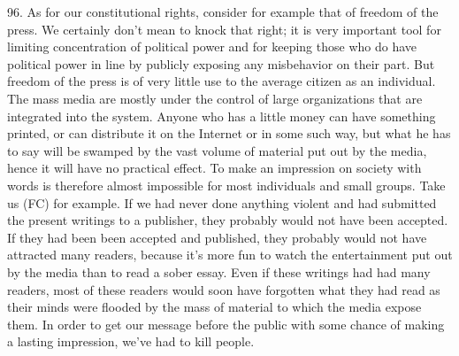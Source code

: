 \documentclass{article}
\begin{document}
96.  As  for  our  constitutional  rights,  consider  for  example  that  of  freedom  of  the  press.   We 
certainly  don’t  mean  to  knock  that  right;  it  is  very  important  tool  for  limiting  concentration  of  
political power and for keeping those who do have political power in line by publicly exposing 
any misbehavior on their part.  But freedom of the press is of very little use to the average citizen 
as  an  individual.   The  mass  media  are  mostly  under  the  control  of  large  organizations  that  are  
integrated  into  the  system.   Anyone  who  has  a  little  money  can  have  something  printed,  or  can  
distribute it on the Internet or in some such way, but what he has to say will be swamped by the 
vast volume of material put out by the media, hence it will have no practical effect.  To make an 
impression on society with words is therefore almost impossible for most individuals and small 
groups.  Take us (FC) for example.  If we had never done anything violent and had submitted the 
present  writings  to  a  publisher,  they  probably  would  not  have  been  accepted.   If  they  had  been  
been accepted and published, they probably would not have attracted many readers, because it’s 
more fun to watch the entertainment put out by the media than to read a sober essay.  Even if these 
writings had had many readers, most of these readers would soon have forgotten what they had 
read as their minds were flooded by the mass of material to which the media expose them.  In order 
to get our message before the public with some chance of making a lasting impression, we’ve had 
to kill people. \vspace{\baselineskip}
\end{document}
